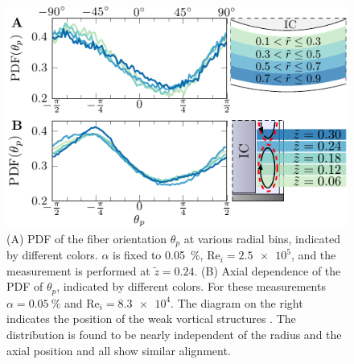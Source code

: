 \begin{figure}[htp]
\centering
\includegraphics{figure11_orient_r_z}
\caption{(A) PDF of the fiber orientation $\theta_p$ at various radial bins,
indicated by different colors. $\alpha$ is fixed to \SI{0.05}{\percent},
$\text{Re}_i = \num{2.5e5}$, and the measurement is performed at $\tilde{z} =
0.24$. (B) Axial dependence of the PDF of $\theta_p$, indicated by different
colors. For these measurements $\alpha=\SI{0.05}{\percent}$ and
$\text{Re}_i=\num{8.3e4}$. The diagram on the right indicates the position of the weak vortical structures \cite{Huisman2014,vanderVeen2016}.
The distribution is found to be nearly independent
of the radius and the axial position and all show similar
alignment.}
\label{fig:orientrz}
\end{figure}

